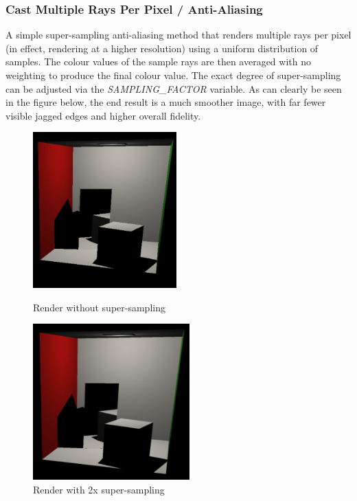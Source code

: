 \documentclass{article}
\begin{document}
    \subsubsection{Cast Multiple Rays Per Pixel / Anti-Aliasing}
    A simple super-sampling anti-aliasing method that renders multiple rays per pixel (in effect, rendering 
    at a higher resolution) using a uniform distribution of samples. The colour values of the sample rays are 
    then averaged with no weighting to produce the final colour value. The exact degree of super-sampling can 
    be adjusted via the \emph{SAMPLING\_FACTOR} variable. As can clearly be seen in the figure below, the end 
    result is a much smoother image, with far fewer visible jagged edges and higher overall fidelity.

    \begin{figure}[!htb]
          \includegraphics[width=\linewidth, height=6cm]{images/supersampling_non_supersampled}
          \caption*{Render without super-sampling}
        \endminipage\hfill
          \includegraphics[width=\linewidth, height=6cm]{images/supersampling_supersampled}
          \caption*{Render with 2x super-sampling}
        \endminipage
    \end{figure}
\end{document}
